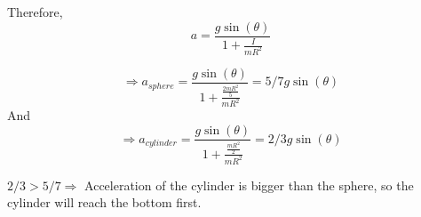 \documentclass{article}
\begin{document}
Therefore,
\begin{equation*}
  a = \frac{g\sin(\theta)}{1 + \frac{I}{mR^2}}
\end{equation*}

\begin{equation*}
  \Rightarrow a_{sphere} = \frac{g\sin(\theta)}{1 + \frac{\frac{2mR^2}{5}}{mR^2}} = 5/7g\sin(\theta)
\end{equation*}
And
\begin{equation*}
  \Rightarrow a_{cylinder} = \frac{g\sin(\theta)}{1 + \frac{\frac{mR^2}{2}}{mR^2}} = 2/3g\sin(\theta)
\end{equation*}

$2/3 > 5/7 \Rightarrow$ Acceleration of the cylinder is bigger than the sphere, so the cylinder will reach the bottom first. 
\end{document}
